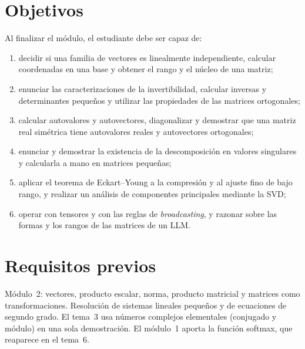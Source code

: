 \documentclass[11pt,a4paper,twoside,openany]{book}
\begin{document}
\section*{Objetivos}
Al finalizar el módulo, el estudiante debe ser capaz de:
\begin{enumerate}[label=\arabic*.]
  \item decidir si una familia de vectores es linealmente independiente, calcular coordenadas en una base y obtener el rango y el núcleo de una matriz;
  \item enunciar las caracterizaciones de la invertibilidad, calcular inversas y determinantes pequeños y utilizar las propiedades de las matrices ortogonales;
  \item calcular autovalores y autovectores, diagonalizar y demostrar que una matriz real simétrica tiene autovalores reales y autovectores ortogonales;
  \item enunciar y demostrar la existencia de la descomposición en valores singulares y calcularla a mano en matrices pequeñas;
  \item aplicar el teorema de Eckart--Young a la compresión y al ajuste fino de bajo rango, y realizar un análisis de componentes principales mediante la SVD;
  \item operar con tensores y con las reglas de \emph{broadcasting}, y razonar sobre las formas y los rangos de las matrices de un LLM.
\end{enumerate}

\section*{Requisitos previos}
Módulo~2: vectores, producto escalar, norma, producto matricial y matrices como transformaciones. Resolución de sistemas lineales pequeños y de ecuaciones de segundo grado. El tema~3 usa números complejos elementales (conjugado y módulo) en una sola demostración. El módulo~1 aporta la función softmax, que reaparece en el tema~6.
\end{document}
